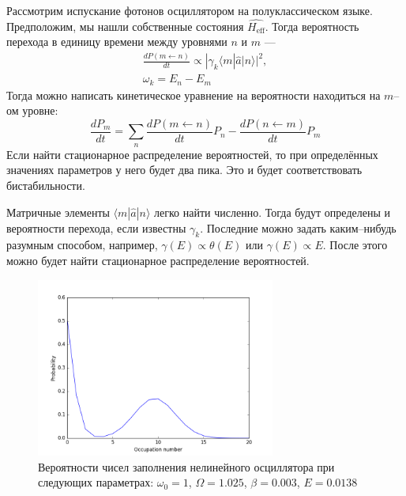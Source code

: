 \documentclass{article}
\begin{document}
Рассмотрим испускание фотонов осциллятором на полуклассическом языке. Предположим, мы нашли
собственные состояния $\hat{H_\mathrm{eff}}$. Тогда вероятность перехода в единицу времени
 между уровнями
$n$ и $m$ ---
\begin{equation}
    \begin{gathered}
        \frac{dP(m \leftarrow n)}{dt} \propto | \gamma_k \langle m | \hat{a} | n \rangle|^2,\\
        \omega_k = E_n - E_m
    \end{gathered}
\end{equation}
Тогда можно написать кинетическое уравнение на вероятности находиться на $m$--ом уровне:
\begin{equation}
    \frac{dP_m}{dt} = \sum_n \frac{dP(m \leftarrow n)}{dt} P_n - \frac{dP(n \leftarrow m)}{dt} P_m
\end{equation}
Если найти стационарное распределение вероятностей, то при определённых значениях параметров 
у него будет два пика. Это и будет соответствовать бистабильности.

Матричные элементы $ \langle m | \hat{a} | n \rangle$ легко найти численно. Тогда будут
определены и вероятности перехода, если известны $\gamma_k$. Последние можно задать
каким--нибудь разумным способом, например, $\gamma(E) \propto \theta(E)$ или
$\gamma(E) \propto E$. После этого можно будет найти стационарное распределение вероятностей.

\begin{figure}[h]
    \centering
    \includegraphics[width=0.7\textwidth]{bistability.png}
    \caption{Вероятности чисел заполнения нелинейного осциллятора при следующих параметрах:
             $\omega_0 = 1$,
             $\Omega=1.025$,
             $\beta=0.003$,
             $E=0.0138$}
\end{figure}
\end{document}
